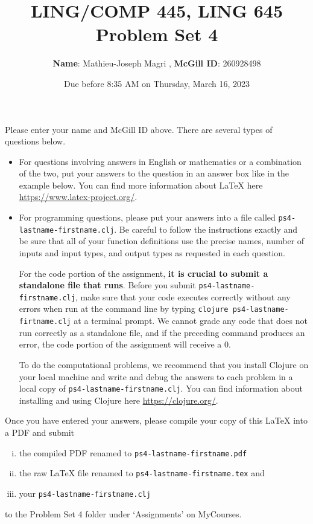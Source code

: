 \documentclass[10pt]{article}
\author{ 
  \textbf{Name}: Mathieu-Joseph Magri      %
, \textbf{McGill ID}: 260928498 %
}
\newcommand{\PSnum}{4}
\begin{document}
\title{LING/COMP 445, LING 645\\Problem Set \PSnum}
\date{Due before 8:35 AM on Thursday, March 16, 2023}
\maketitle
Please enter your name and McGill ID above.
There are several types of questions below. 
\begin{itemize}
\item
For questions involving answers in English or mathematics or a
combination of the two, put your answers to the question in an
answer box like in the example below. You can find more
information about \LaTeX{} here \url{https://www.latex-project.org/}.

\item For programming questions,
please put your answers into a file called
\texttt{ps\PSnum-lastname-firstname.clj}. Be careful to follow the instructions
exactly and be sure that all of your function definitions use the
precise names, number of inputs and input types, and output types as
requested in each question.

For the code portion of the assignment, \textbf{it is crucial to submit a
standalone file that runs}. Before you submit \texttt{ps\PSnum-lastname-firstname.clj}, 
make sure that your code executes correctly without any errors 
when run at the command line by typing 
\texttt{clojure ps\PSnum-lastname-firtname.clj} at a terminal
prompt. We cannot grade any code that does not run correctly as a
standalone file, and if the preceding command produces an error,
the code portion of the assignment will receive a $0$.

To do the computational problems, we recommend that you install
Clojure on your local machine and write and debug the answers to each
problem in a local copy of \texttt{ps\PSnum-lastname-firstname.clj}. You can
find information about installing and using Clojure here
\url{https://clojure.org/}.
\end{itemize}
Once you have entered your answers, please compile your copy of this
\LaTeX{} into a PDF and submit 
\begin{enumerate}[(i),noitemsep]
\item
the compiled PDF renamed to
\texttt{ps\PSnum-lastname-firstname.pdf} 
\item
the raw \LaTeX{} file renamed to
\texttt{ps\PSnum-lastname-firstname.tex} and 
\item
your \texttt{ps\PSnum-lastname-firstname.clj}
\end{enumerate}
to the Problem Set \PSnum{} folder under `Assignments' on MyCourses.
\end{document}
